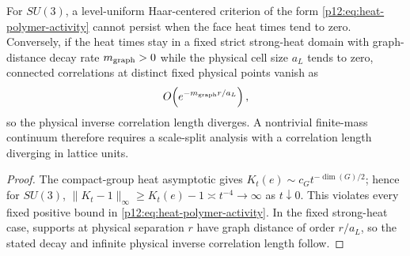 \documentclass[12pt,a4paper]{article}
\begin{document}
\begin{proposition}
\label{p12:prop:no-one-regime-haar-polymer-continuum}
For $SU(3)$, a level-uniform Haar-centered criterion of the form
\eqref{p12:eq:heat-polymer-activity} cannot persist when the face heat times
tend to zero.  Conversely, if the heat times stay in a fixed strict
strong-heat domain with graph-distance decay rate $m_{\rm graph}>0$ while the
physical cell size $a_L$ tends to zero, connected correlations at distinct
fixed physical points vanish as
\[
 O\!\left(e^{-m_{\rm graph}r/a_L}\right),
\]
so the physical inverse correlation length diverges.  A nontrivial finite-mass
continuum therefore requires a scale-split analysis with a correlation length
diverging in lattice units.
\end{proposition}
\begin{proof}
The compact-group heat asymptotic gives
$K_t(e)\sim c_Gt^{-\dim(G)/2}$; hence for $SU(3)$,
$\|K_t-1\|_\infty\ge K_t(e)-1\asymp t^{-4}\to\infty$ as $t\downarrow0$.
This violates every fixed positive bound in
\eqref{p12:eq:heat-polymer-activity}.  In the fixed strong-heat case, supports
at physical separation $r$ have graph distance of order $r/a_L$, so the
stated decay and infinite physical inverse correlation length follow.
\end{proof}
\end{document}
